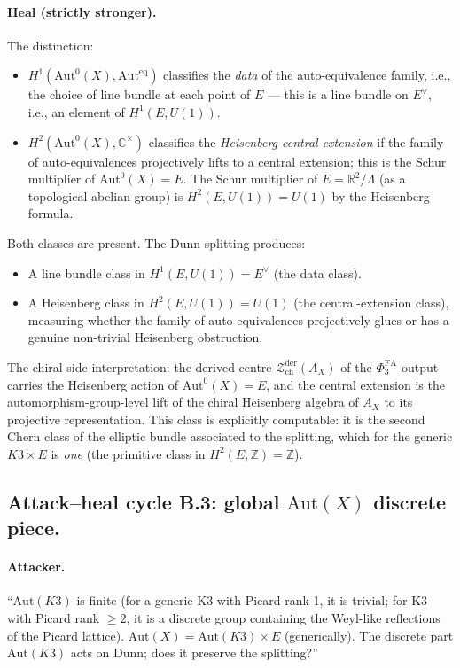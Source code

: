 \documentclass[11pt]{article}
\newcommand{\PhiFA}{\Phi^{\mathrm{FA}}}
\newcommand{\R}{\mathbb{R}}
\newcommand{\C}{\mathbb{C}}
\newcommand{\Z}{\mathbb{Z}}
\newcommand{\cZ}{\mathcal{Z}}
\newcommand{\Aut}{\mathrm{Aut}}
\newcommand{\Auteq}{\mathrm{Aut}^{\mathrm{eq}}}
\begin{document}
\paragraph{Heal (strictly stronger).}
The distinction:
\begin{itemize}
\item $H^1(\Aut^0(X), \Auteq)$ classifies the \emph{data} of the
  auto-equivalence family, i.e., the choice of line bundle at each
  point of $E$ --- this is a line bundle on $E^\vee$, i.e., an element
  of $H^1(E, U(1))$.
\item $H^2(\Aut^0(X), \C^\times)$ classifies the \emph{Heisenberg central
  extension} if the family of auto-equivalences projectively lifts to a
  central extension; this is the Schur multiplier of
  $\Aut^0(X) = E$. The Schur multiplier of $E = \R^2 / \Lambda$ (as a
  topological abelian group) is $H^2(E, U(1)) = U(1)$ by the Heisenberg
  formula.
\end{itemize}

Both classes are present. The Dunn splitting produces:
\begin{itemize}
\item A line bundle class in $H^1(E, U(1)) = E^\vee$ (the data class).
\item A Heisenberg class in $H^2(E, U(1)) = U(1)$ (the central-extension
  class), measuring whether the family of auto-equivalences projectively
  glues or has a genuine non-trivial Heisenberg obstruction.
\end{itemize}

The chiral-side interpretation: the derived centre
$\cZ^{\mathrm{der}}_{\mathrm{ch}}(A_X)$ of the $\PhiFA_3$-output carries
the Heisenberg action of $\Aut^0(X) = E$, and the central extension
is the automorphism-group-level lift of the chiral Heisenberg algebra
of $A_X$ to its projective representation. This class is explicitly
computable: it is the second Chern class of the elliptic bundle
associated to the splitting, which for the generic $K3 \times E$ is
\emph{one} (the primitive class in $H^2(E, \Z) = \Z$).

\subsection{Attack--heal cycle B.3: global $\Aut(X)$ discrete piece.}

\paragraph{Attacker.}
``$\Aut(K3)$ is finite (for a generic K3 with Picard rank 1, it is
trivial; for K3 with Picard rank $\geq 2$, it is a discrete group
containing the Weyl-like reflections of the Picard lattice).
$\Aut(X) = \Aut(K3) \times E$ (generically). The discrete part
$\Aut(K3)$ acts on Dunn; does it preserve the splitting?''
\end{document}
